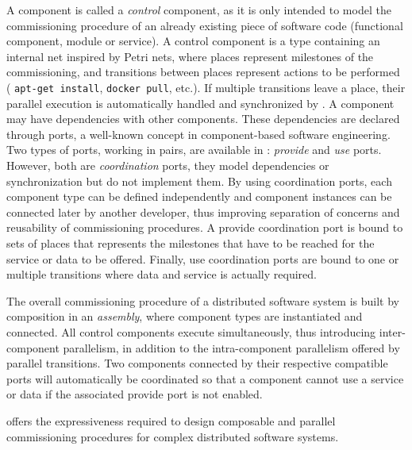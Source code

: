 A \mad component is called a \emph{control} component, as it is only
intended to model the commissioning procedure of an already existing
piece of software code (functional component, module or service). A
\mad control component is a type containing an internal net inspired by Petri
nets, where places represent milestones of the commissioning, and
transitions between places represent actions to be performed (\eg
\texttt{apt-get install}, \texttt{docker pull}, etc.). If multiple
transitions leave a place, their parallel execution is automatically
handled and synchronized by \mad. A component may have dependencies
with other components. These dependencies are declared through ports,
a well-known concept in component-based software engineering. Two
types of ports, working in pairs, are available in \mad:
\emph{provide} and \emph{use} ports. However, both are
\emph{coordination} ports, \ie they model dependencies or
synchronization but do not implement them. By using coordination
ports, each component type can be defined independently and component
instances can be connected later by another developer, thus improving
separation of concerns and reusability of commissioning procedures. A
provide coordination port is bound to sets of places that represents
the milestones that have to be reached for the service or data to be
offered. Finally, use coordination ports are bound to one or multiple
transitions where data and service is actually required.

The overall commissioning procedure of a distributed software system
is built by composition in an \emph{assembly}, where component types
are instantiated and connected. All control components execute
simultaneously, thus introducing inter-component parallelism, in
addition to the intra-component parallelism offered by parallel
transitions. Two components connected by their respective compatible
ports will automatically be coordinated so that a component cannot use
a service or data if the associated provide port is not enabled.

\mad offers the expressiveness required to design composable and parallel
commissioning procedures for complex distributed software systems.


